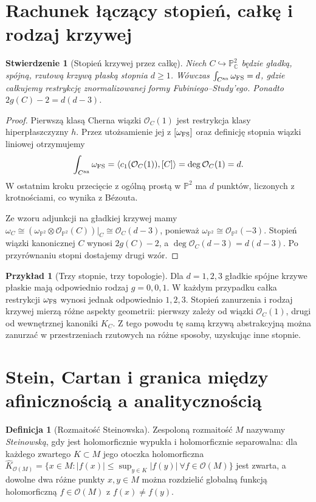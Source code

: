 \documentclass[11pt,a4paper,openany]{report}
\numberwithin{equation}{section}
\theoremstyle{plain}
\newtheorem{stwierdzenie}[twierdzenie]{Stwierdzenie}
\theoremstyle{definition}
\newtheorem{definicja}[twierdzenie]{Definicja}
\newtheorem{przyklad}[twierdzenie]{Przykład}
\theoremstyle{remark}
\newcommand{\C}{\mathbb C}
\newcommand{\PP}{\mathbb P}
\begin{document}
\section{Rachunek łączący stopień, całkę i rodzaj krzywej}
\label{sec:ga9-degree-genus}

\begin{stwierdzenie}[Stopień krzywej przez całkę]
Niech $C\hookrightarrow\PP^2_\C$ będzie gładką,
spójną, rzutową krzywą płaską stopnia $d\ge1$.
Wówczas
$\int_{C^{\rm an}}\omega_{\rm FS}=d$,
gdzie całkujemy restrykcję znormalizowanej formy
Fubiniego--Study'ego. Ponadto
$2g(C)-2=d(d-3)$.
\end{stwierdzenie}
\begin{proof}
Pierwszą klasą Cherna wiązki $\mathcal O_C(1)$
jest restrykcja klasy hiperpłaszczyzny $h$.
Przez utożsamienie jej z $[\omega_{\rm FS}]$
oraz definicję stopnia wiązki liniowej otrzymujemy
\[
 \int_{C^{\rm an}}\omega_{\rm FS}
 =\langle c_1(\mathcal O_C(1)),[C]\rangle
 =\deg\mathcal O_C(1)=d.
\]
W ostatnim kroku przecięcie z ogólną prostą w
$\PP^2$ ma $d$ punktów, liczonych z krotnościami,
co wynika z Bézouta.

Ze wzoru adjunkcji na gładkiej krzywej mamy
$\omega_C\cong
(\omega_{\PP^2}\otimes\mathcal O_{\PP^2}(C))|_C
\cong\mathcal O_C(d-3)$,
ponieważ $\omega_{\PP^2}\cong\mathcal O_{\PP^2}(-3)$.
Stopień wiązki kanonicznej $C$ wynosi $2g(C)-2$,
a $\deg\mathcal O_C(d-3)=d(d-3)$. Po przyrównaniu
stopni dostajemy drugi wzór.
\end{proof}

\begin{przyklad}[Trzy stopnie, trzy topologie]
Dla $d=1,2,3$ gładkie spójne krzywe płaskie mają
odpowiednio rodzaj $g=0,0,1$. W każdym przypadku
całka restrykcji $\omega_{\rm FS}$ wynosi jednak
odpowiednio $1,2,3$. Stopień zanurzenia i rodzaj
krzywej mierzą różne aspekty geometrii: pierwszy
zależy od wiązki $\mathcal O_C(1)$, drugi od
wewnętrznej kanoniki $K_C$. Z tego powodu tę samą
krzywą abstrakcyjną można zanurzać w przestrzeniach
rzutowych na różne sposoby, uzyskując inne stopnie.
\end{przyklad}

\section{Stein, Cartan i granica między afinicznością a analitycznością}
\label{sec:ga9-stein}

\begin{definicja}[Rozmaitość Steinowska]
Zespoloną rozmaitość $M$ nazywamy \emph{Steinowską},
gdy jest holomorficznie wypukła i holomorficznie
separowalna: dla każdego zwartego $K\subset M$
jego otoczka holomorficzna
$\widehat K_{\mathcal O(M)}=
 \{x\in M:|f(x)|\le\sup_{y\in K}|f(y)|\ \forall f\in\mathcal O(M)\}$
jest zwarta, a dowolne dwa różne punkty $x,y\in M$
można rozdzielić globalną funkcją holomorficzną
$f\in\mathcal O(M)$ z $f(x)\ne f(y)$.
\end{definicja}
\end{document}
